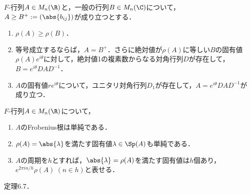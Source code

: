 \documentclass[uplatex, dvipdfmx]{jsreport}
\begin{document}
\begin{theorem}[$F$-行列の対角化]
    $F$-行列$A\in M_n(\R)$と，一般の行列$B\in M_n(\C)$について，$A\ge B^+:=(\abs{b_{ij}})$が成り立つとする．
    \begin{enumerate}
        \item $\rho(A)\ge\rho(B)$．
        \item 等号成立するならば，$A=B^+$．さらに絶対値が$\rho(A)$に等しい$B$の固有値$\rho(A)e^{i\theta}$に対して，絶対値1の複素数からなる対角行列$D$が存在して，$B=e^{i\theta}DAD^{-1}$．
        \item $A$の固有値$re^{i\theta}$について，ユニタリ対角行列$D_1$が存在して，$A=e^{i\theta}DAD^{-1}$が成り立つ．
    \end{enumerate}
\end{theorem}

\begin{theorem}[$F$-行列の最大絶対値を持つ固有値]
    $F$-行列$A\in M_n(\R)$について，
    \begin{enumerate}
        \item $A$のFrobenius根は単純である．
        \item $\rho(A)=\abs{\lambda}$を満たす固有値$\lambda\in\Sp(A)$も単純である．
        \item $A$の周期を$h$とすれば，$\abs{\lambda}=\rho(A)$を満たす固有値は$h$個あり，$e^{2\pi in/h}\rho(A)\;(n\in h)$と表せる．
    \end{enumerate}
\end{theorem}
\begin{Proof}
    \cite{岩堀77-線型不等式}定理6.7．
\end{Proof}
\end{document}
